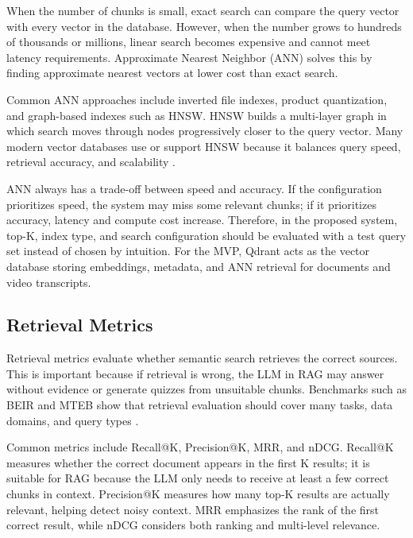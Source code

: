 When the number of chunks is small, exact search can compare the query
vector with every vector in the database. However, when the number grows
to hundreds of thousands or millions, linear search becomes expensive and
cannot meet latency requirements. Approximate Nearest Neighbor (ANN)
solves this by finding approximate nearest vectors at lower cost than
exact search.

Common ANN approaches include inverted file indexes, product quantization,
and graph-based indexes such as HNSW. HNSW builds a multi-layer graph in
which search moves through nodes progressively closer to the query vector.
Many modern vector databases use or support HNSW because it balances query
speed, retrieval accuracy, and scalability
\cite{malkov2018hnsw,johnson2019faiss}.

ANN always has a trade-off between speed and accuracy. If the configuration
prioritizes speed, the system may miss some relevant chunks; if it
prioritizes accuracy, latency and compute cost increase. Therefore, in the
proposed system, top-K, index type, and search configuration should be
evaluated with a test query set instead of chosen by intuition. For the
MVP, Qdrant acts as the vector database storing embeddings, metadata, and
ANN retrieval for documents and video transcripts.

\subsection{Retrieval Metrics}
\label{subsec:retrieval-metrics}

Retrieval metrics evaluate whether semantic search retrieves the correct
sources. This is important because if retrieval is wrong, the LLM in RAG
may answer without evidence or generate quizzes from unsuitable chunks.
Benchmarks such as BEIR and MTEB show that retrieval evaluation should
cover many tasks, data domains, and query types
\cite{thakur2021beir,muennighoff2023mteb}.

Common metrics include Recall@K, Precision@K, MRR, and nDCG. Recall@K
measures whether the correct document appears in the first K results; it
is suitable for RAG because the LLM only needs to receive at least a few
correct chunks in context. Precision@K measures how many top-K results
are actually relevant, helping detect noisy context. MRR emphasizes the
rank of the first correct result, while nDCG considers both ranking and
multi-level relevance.

